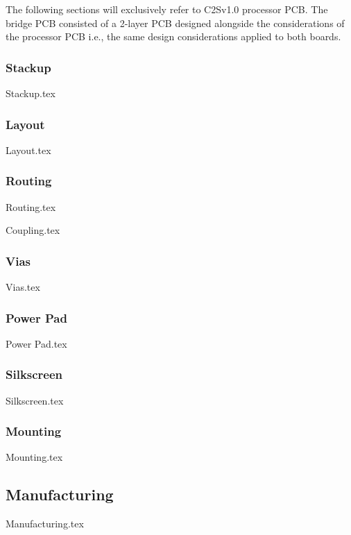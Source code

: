     The following sections will exclusively refer to C2Sv1.0 processor PCB. The bridge PCB consisted of a 2-layer PCB designed alongside the considerations of the processor PCB i.e., the same design considerations applied to both boards.

    \subsubsection{Stackup}
        {Stackup.tex}

    \subsubsection{Layout}\label{sec:v1-layout}
        {Layout.tex}

    \subsubsection{Routing}\label{sec:v1-routing}
        {Routing.tex}

    \label{sec:v1-coupling}
        {Coupling.tex}

    \subsubsection{Vias}
        {Vias.tex}

    \subsubsection{Power Pad}
        {Power Pad.tex}

    \subsubsection{Silkscreen}
        {Silkscreen.tex}

    \subsubsection{Mounting}
        {Mounting.tex}


\subsection{Manufacturing}\label{sec:v1-manufacturing}
    {Manufacturing.tex}

